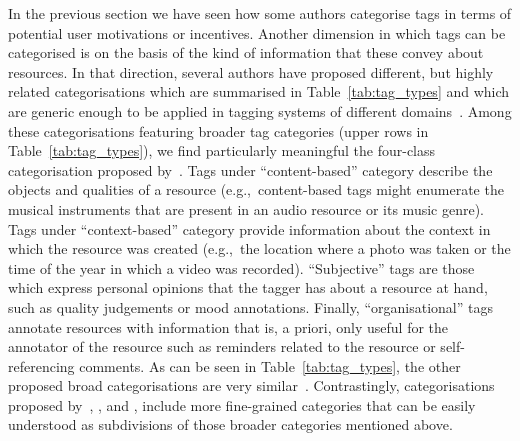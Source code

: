 In the previous section we have seen how some authors categorise tags in terms of potential user motivations or incentives. 
Another dimension in which tags can be categorised is on the basis of the kind of information that these convey about resources.
In that direction, several authors have proposed different, but highly related categorisations which are summarised in Table~\ref{tab:tag_types} and which are generic enough to be applied in tagging systems of different domains~\citep{golder2006,Sen,Xu2006,Bischoff2008,Gupta2010,cantador2010}. 
Among these categorisations featuring broader tag categories (upper rows in Table~\ref{tab:tag_types}), we find particularly meaningful the four-class categorisation proposed by~\cite{cantador2010}. Tags under ``content-based'' category describe the objects and qualities of a resource (e.g.,~content-based tags might enumerate the musical instruments that are present in an audio resource or its music genre). Tags under ``context-based'' category provide information about the context in which the resource was created (e.g.,~the location where a photo was taken or the time of the year in which a video was recorded). ``Subjective'' tags are those which express personal opinions that the tagger has about a resource at hand, such as quality judgements or mood annotations. Finally, ``organisational'' tags annotate resources with information that is, a priori, only useful for the annotator of the resource such as reminders related to the resource or self-referencing comments.
As can be seen in Table~\ref{tab:tag_types}, the other proposed broad categorisations are very similar~\citep{Sen,Xu2006}. Contrastingly, categorisations proposed by~\cite{golder2006}, \cite{Bischoff2008}, and \cite{Gupta2010}, include more fine-grained categories that can be easily understood as subdivisions of those broader categories mentioned above. 


